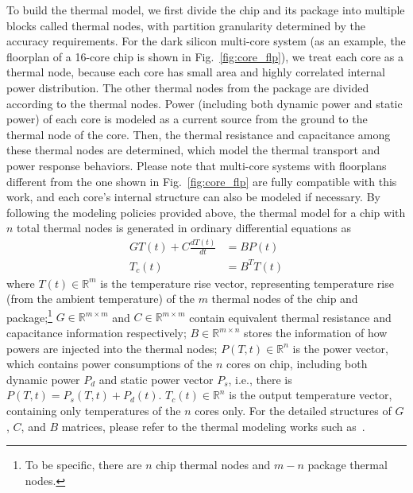 To build the thermal model, we first divide the chip and its package
into multiple blocks called thermal nodes, with partition granularity
determined by the accuracy requirements. For the dark silicon
multi-core system (as an example, the floorplan of a 16-core chip is shown in
Fig.~\ref{fig:core_flp}), we treat each core as a thermal node,
because each core has small area and highly correlated internal power
distribution. The other thermal nodes from the package are divided
according to the thermal nodes. Power (including both dynamic power
and static power) of each core is modeled as a current source from the
ground to the thermal node of the core. Then, the thermal resistance
and capacitance among these thermal nodes are determined, which model
the thermal transport and power response behaviors. Please note that
multi-core systems with floorplans different from the one shown in
Fig.~\ref{fig:core_flp} are fully compatible with this work, and each
core's internal structure can also be modeled if necessary. By
following the modeling policies provided above, the thermal model for
a chip with $n$ total thermal nodes is generated in ordinary
differential equations as
\begin{equation}\label{eq:therm_model}
\begin{split}
GT(t) + C\frac{dT(t)}{dt} &= BP(t)\\
T_{c}(t) &= B^{T}T(t)
\end{split}
\end{equation}
where $T(t) \in \mathbb{R}^m$ is the temperature rise vector,
representing temperature rise (from the ambient temperature) of the $m$
thermal nodes of the chip and package;\footnote{To be specific, there are $n$ chip thermal
nodes and $m-n$ package thermal nodes.} $G \in \mathbb{R}^{m\times m}$
and  $C \in \mathbb{R}^{m \times m}$ contain equivalent thermal
resistance and capacitance information respectively; $B \in
\mathbb{R}^{m \times n}$ stores the information of how powers are
injected into the thermal nodes; $P(T, t) \in \mathbb{R}^{n}$ is the
power vector, which contains power consumptions of the $n$ cores on
chip, including both dynamic power $P_d$ and static power vector
$P_s$, i.e., there is $P(T, t)=P_s(T, t)+P_d(t)$. $T_{c}(t) \in
\mathbb{R}^n$ is the output temperature vector, containing only
temperatures of the $n$ cores only. For the detailed structures of $G$, $C$,
and $B$ matrices, please refer to the thermal modeling works such
as~\cite{Huang:TVLSI'06,Huang:TC'08,WangTan:TODAES'13,Hanumaiah:TCAD'11}. 